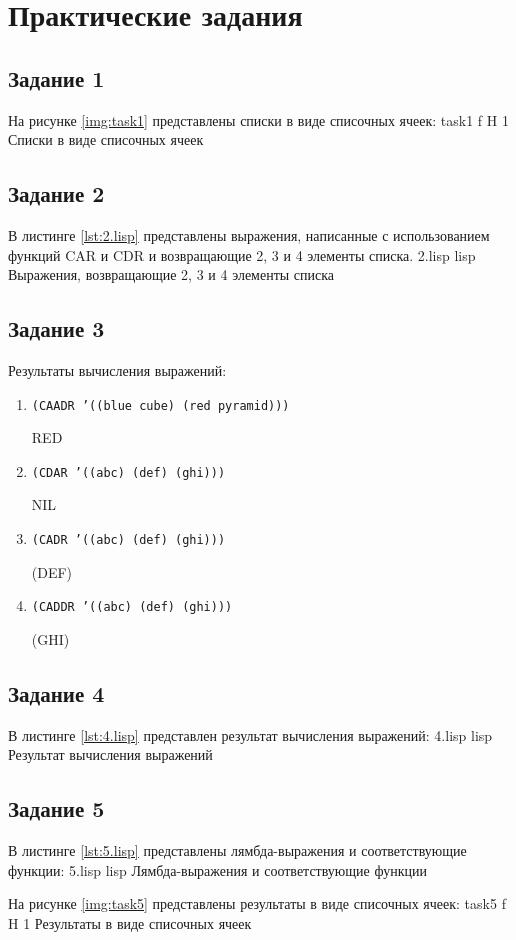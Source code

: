 \chapter{Практические задания}

\section{Задание 1}

На рисунке \ref{img:task1} представлены списки в виде списочных ячеек:
	{task1}
	{f}
	{H}
	{1\textwidth}
	{Списки в виде списочных ячеек}

\section{Задание 2}

В листинге \ref{lst:2.lisp} представлены выражения, написанные с использованием функций CAR и CDR и возвращающие 2, 3 и 4 элементы списка.
	{2.lisp}
	{lisp}
	{Выражения, возвращающие 2, 3 и 4 элементы списка}

\section{Задание 3}

Результаты вычисления выражений:
\begin{enumerate}
	\item \texttt{(CAADR '((blue cube) (red pyramid)))}
	
	RED
	\item \texttt{(CDAR '((abc) (def) (ghi)))}
	
	NIL
	\item \texttt{(CADR '((abc) (def) (ghi)))}
	
	(DEF)
	\item \texttt{(CADDR '((abc) (def) (ghi)))}
	
	(GHI)	
\end{enumerate}

\section{Задание 4}

В листинге \ref{lst:4.lisp} представлен результат вычисления выражений:
	{4.lisp}
	{lisp}
	{Результат вычисления выражений}

\section{Задание 5}

В листинге \ref{lst:5.lisp} представлены лямбда-выражения и соответствующие функции:
	{5.lisp}
	{lisp}
	{Лямбда-выражения и соответствующие функции}

\newpage

На рисунке \ref{img:task5} представлены результаты в виде списочных ячеек:
	{task5}
	{f}
	{H}
	{1\textwidth}
	{Результаты в виде списочных ячеек}